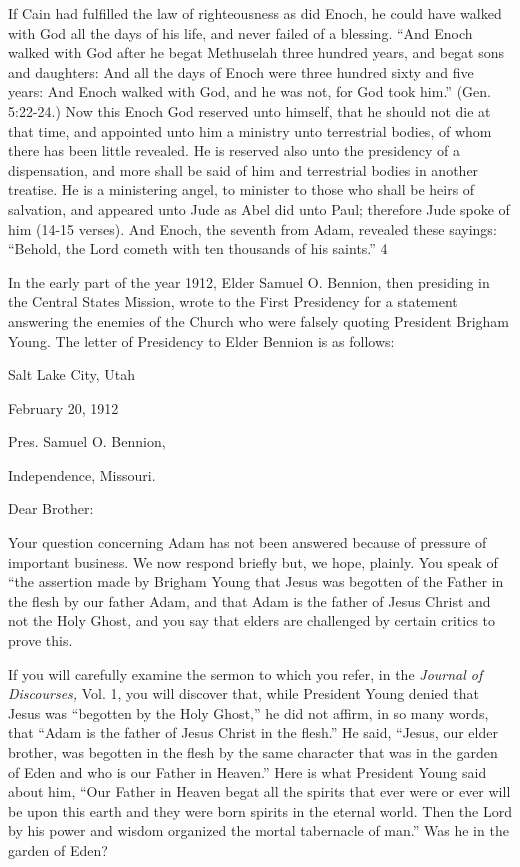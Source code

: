If Cain had fulfilled the law of righteousness as did Enoch, he could have walked with God
all the days of his life, and never failed of a blessing. ``And Enoch walked with God after he
begat Methuselah three hundred years, and begat sons and daughters: And all the days of
Enoch were three hundred sixty and five years: And Enoch walked with God, and he was not,
for God took him.'' (Gen. 5:22-24.) Now this Enoch God reserved unto himself, that he
should not die at that time, and appointed unto him a ministry unto terrestrial bodies, of
whom there has been little revealed. He is reserved also unto the presidency of a
dispensation, and more shall be said of him and terrestrial bodies in another treatise. He is a
ministering angel, to minister to those who shall be heirs of salvation, and appeared unto
Jude as Abel did unto Paul; therefore Jude spoke of him (14-15 verses). And Enoch, the
seventh from Adam, revealed these sayings: ``Behold, the Lord cometh with ten thousands of
his saints.'' 4

In the early part of the year 1912, Elder Samuel O. Bennion, then presiding in the Central
States Mission, wrote to the First Presidency for a statement answering the enemies of the
Church who were falsely quoting President Brigham Young. The letter of Presidency to
Elder Bennion is as follows:

Salt Lake City, Utah

February 20, 1912

Pres. Samuel O. Bennion,

Independence, Missouri.

Dear Brother:

Your question concerning Adam has not been answered because of pressure of important
business. We now respond briefly but, we hope, plainly. You speak of ``the assertion made by
Brigham Young that Jesus was begotten of the Father in the flesh by our father Adam, and
that Adam is the father of Jesus Christ and not the Holy Ghost, and you say that elders are
challenged by certain critics to prove this.

If you will carefully examine the sermon to which you refer, in the \textit{Journal of Discourses,}
Vol. 1, you will discover that, while President Young denied that Jesus was ``begotten by the
Holy Ghost,'' he did not affirm, in so many words, that ``Adam is the father of Jesus Christ in
the flesh.'' He said, ``Jesus, our elder brother, was begotten in the flesh by the same character
that was in the garden of Eden and who is our Father in Heaven.'' Here is what President
Young said about him, ``Our Father in Heaven begat all the spirits that ever were or ever will
be upon this earth and they were born spirits in the eternal world. Then the Lord by his power
and wisdom organized the mortal tabernacle of man.'' Was he in the garden of Eden?


